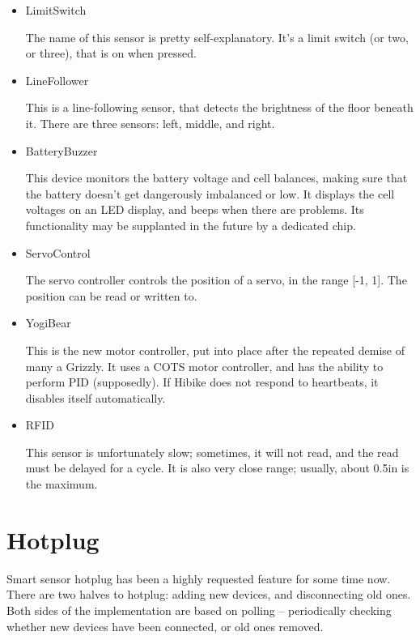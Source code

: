 \documentclass[12pt]{book}
\begin{document}
\begin{itemize}
    \item LimitSwitch
        
        The name of this sensor is pretty self-explanatory. It's a limit
        switch (or two, or three), that is on when pressed.
    \item LineFollower

        This is a line-following sensor, that detects the brightness of
        the floor beneath it. There are three sensors: left, middle,
        and right.
    \item BatteryBuzzer

        This device monitors the battery voltage and cell balances,
        making sure that the battery doesn't get dangerously
        imbalanced or low. It displays the cell voltages
        on an LED display, and beeps when there are problems.
        Its functionality may be supplanted in
        the future by a dedicated chip.
    \item ServoControl

        The servo controller controls the position of a servo,
        in the range [-1, 1]. The position can be read or written to.

    \item YogiBear

        This is the new motor controller, put into place after the
        repeated demise of many a Grizzly. It uses a COTS motor controller,
        and has the ability to perform PID (supposedly). If Hibike
        does not respond to heartbeats, it disables itself automatically.

    \item RFID

        This sensor is unfortunately slow; sometimes, it will not read,
        and the read must be delayed for a cycle. It is also very close
        range; usually, about 0.5in is the maximum.
\end{itemize}

\section{Hotplug}
Smart sensor hotplug has been a highly requested feature for some time now.
There are two halves to hotplug: adding new devices, and disconnecting old ones.
Both sides of the implementation are based on polling -- periodically checking
whether new devices have been connected, or old ones removed.
\end{document}
